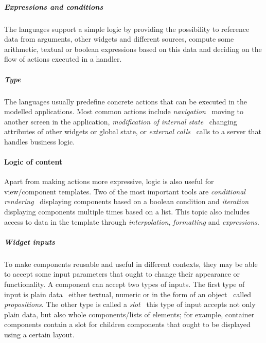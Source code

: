 \subparagraph{Expressions and conditions}
The languages support a simple logic by providing the possibility to reference data from arguments, other widgets and different sources, compute some arithmetic, textual or boolean expressions based on this data and deciding on the flow of actions executed in a handler.

\subparagraph{Type}
The languages usually predefine concrete actions that can be executed in the modelled applications.
Most common actions include \emph{navigation} \textendash\ moving to another screen in the application, \emph{modification of internal state} \textendash\ changing attributes of other widgets or global state, or \emph{external calls} \textendash\ calls to a server that handles business logic.


%

\paragraph{Logic of content}
Apart from making actions more expressive, logic is also useful for view/component templates.
Two of the most important tools are \emph{conditional rendering} \textendash\ displaying components based on a boolean condition and \emph{iteration} displaying components multiple times based on a list.
This topic also includes access to data in the template through \emph{interpolation}, \emph{formatting} and \emph{expressions}.

\subparagraph{Widget inputs}
To make components reusable and useful in different contexts, they may be able to accept some input parameters that ought to change their appearance or functionality.
A component can accept two types of inputs.
The first type of input is plain data \textendash\ either textual, numeric or in the form of an object \textendash\ called \emph{propositions}.
The other type is called a \emph{slot} \textendash\ this type of input accepts not only plain data, but also whole components/lists of elements;
for example, container components contain a slot for children components that ought to be displayed using a certain layout.

